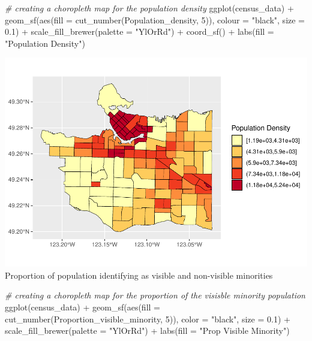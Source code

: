 \documentclass[
]{article}
\newenvironment{Shaded}{\begin{snugshade}}{\end{snugshade}}
\newcommand{\AttributeTok}[1]{\textcolor[rgb]{0.77,0.63,0.00}{#1}}
\newcommand{\CommentTok}[1]{\textcolor[rgb]{0.56,0.35,0.01}{\textit{#1}}}
\newcommand{\DecValTok}[1]{\textcolor[rgb]{0.00,0.00,0.81}{#1}}
\newcommand{\FloatTok}[1]{\textcolor[rgb]{0.00,0.00,0.81}{#1}}
\newcommand{\FunctionTok}[1]{\textcolor[rgb]{0.00,0.00,0.00}{#1}}
\newcommand{\NormalTok}[1]{#1}
\newcommand{\SpecialCharTok}[1]{\textcolor[rgb]{0.00,0.00,0.00}{#1}}
\newcommand{\StringTok}[1]{\textcolor[rgb]{0.31,0.60,0.02}{#1}}
\begin{document}
\begin{Shaded}
\begin{Highlighting}[]
\CommentTok{\# creating a choropleth map for the population density}
\FunctionTok{ggplot}\NormalTok{(census\_data) }\SpecialCharTok{+}
  \FunctionTok{geom\_sf}\NormalTok{(}\FunctionTok{aes}\NormalTok{(}\AttributeTok{fill =} \FunctionTok{cut\_number}\NormalTok{(Population\_density, }\DecValTok{5}\NormalTok{)),}
          \AttributeTok{colour =} \StringTok{"black"}\NormalTok{,}
          \AttributeTok{size =} \FloatTok{0.1}\NormalTok{) }\SpecialCharTok{+}
  \FunctionTok{scale\_fill\_brewer}\NormalTok{(}\AttributeTok{palette =} \StringTok{"YlOrRd"}\NormalTok{) }\SpecialCharTok{+}
  \FunctionTok{coord\_sf}\NormalTok{() }\SpecialCharTok{+}
  \FunctionTok{labs}\NormalTok{(}\AttributeTok{fill =} \StringTok{"Population Density"}\NormalTok{)}
\end{Highlighting}
\end{Shaded}

\includegraphics{4GA3Markdown_files/figure-latex/unnamed-chunk-23-1.pdf}
Proportion of population identifying as visible and non-visible
minorities

\begin{Shaded}
\begin{Highlighting}[]
\CommentTok{\# creating a choropleth map for the proportion of the visisble minority population}
\FunctionTok{ggplot}\NormalTok{(census\_data) }\SpecialCharTok{+}
\FunctionTok{geom\_sf}\NormalTok{(}\FunctionTok{aes}\NormalTok{(}\AttributeTok{fill =} \FunctionTok{cut\_number}\NormalTok{(Proportion\_visible\_minority, }\DecValTok{5}\NormalTok{)),}
        \AttributeTok{color =} \StringTok{"black"}\NormalTok{,}
        \AttributeTok{size =} \FloatTok{0.1}\NormalTok{) }\SpecialCharTok{+}
\FunctionTok{scale\_fill\_brewer}\NormalTok{(}\AttributeTok{palette =} \StringTok{"YlOrRd"}\NormalTok{) }\SpecialCharTok{+}
\FunctionTok{labs}\NormalTok{(}\AttributeTok{fill =} \StringTok{"Prop Visible Minority"}\NormalTok{)}
\end{Highlighting}
\end{Shaded}
\end{document}
